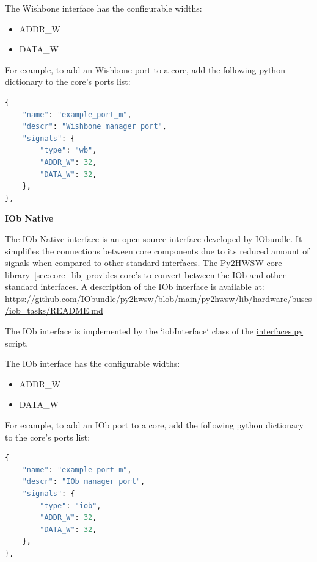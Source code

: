 
The Wishbone interface has the configurable widths:
\begin{itemize}
  \item ADDR\_W
  \item DATA\_W
\end{itemize}

For example, to add an Wishbone port to a core, add the following python dictionary to the core's ports list:
\begin{lstlisting}[language=python]
{
	"name": "example_port_m",
	"descr": "Wishbone manager port",
	"signals": {
		"type": "wb",
		"ADDR_W": 32,
		"DATA_W": 32,
	},
},
\end{lstlisting}


%
%
\clearpage
\large\textbf{IOb Native}

The IOb Native interface is an open source interface developed by IObundle.
It simplifies the connections between core components due to its reduced amount of signals when compared to other standard interfaces.
The Py2HWSW core library~\ref{sec:core_lib} provides core's to convert between the IOb and other standard interfaces.
A description of the IOb interface is available at:
\url{https://github.com/IObundle/py2hwsw/blob/main/py2hwsw/lib/hardware/buses/iob_tasks/README.md}

The IOb interface is implemented by the `iobInterface` class of the \href{https://github.com/IObundle/py2hwsw/blob/main/py2hwsw/scripts/interfaces.py}{interfaces.py} script.


The IOb interface has the configurable widths:
\begin{itemize}
  \item ADDR\_W
  \item DATA\_W
\end{itemize}

For example, to add an IOb port to a core, add the following python dictionary to the core's ports list:
\begin{lstlisting}[language=python]
{
	"name": "example_port_m",
	"descr": "IOb manager port",
	"signals": {
		"type": "iob",
		"ADDR_W": 32,
		"DATA_W": 32,
	},
},
\end{lstlisting}


